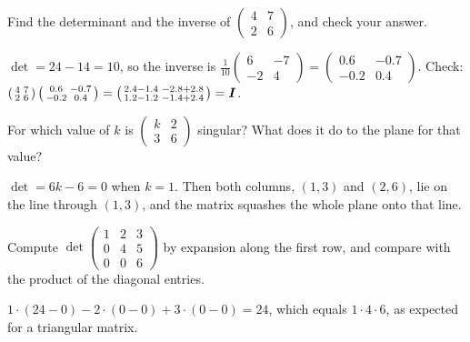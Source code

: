 \begin{exercise}
Find the determinant and the inverse of
$\left(\begin{smallmatrix} 4 & 7\\ 2 & 6\end{smallmatrix}\right)$, and check
your answer.
\end{exercise}
\begin{solution}
$\det = 24 - 14 = 10$, so the inverse is
$\tfrac{1}{10}\left(\begin{smallmatrix} 6 & -7\\ -2 & 4\end{smallmatrix}\right)
= \left(\begin{smallmatrix} 0.6 & -0.7\\ -0.2 & 0.4\end{smallmatrix}\right)$.
Check: $\left(\begin{smallmatrix} 4 & 7\\ 2 & 6\end{smallmatrix}\right)
\left(\begin{smallmatrix} 0.6 & -0.7\\ -0.2 & 0.4\end{smallmatrix}\right) =
\left(\begin{smallmatrix} 2.4 - 1.4 & -2.8 + 2.8\\ 1.2 - 1.2 & -1.4 +
2.4\end{smallmatrix}\right) = \bm{I}$.
\end{solution}

\begin{exercise}
For which value of $k$ is $\left(\begin{smallmatrix} k & 2\\ 3 &
6\end{smallmatrix}\right)$ singular? What does it do to the plane for that
value?
\end{exercise}
\begin{solution}
$\det = 6k - 6 = 0$ when $k = 1$. Then both columns, $(1, 3)$ and $(2, 6)$, lie
on the line through $(1, 3)$, and the matrix squashes the whole plane onto that
line.
\end{solution}

\begin{exercise}
Compute $\det\left(\begin{smallmatrix} 1 & 2 & 3\\ 0 & 4 & 5\\ 0 & 0 &
6\end{smallmatrix}\right)$ by expansion along the first row, and compare with
the product of the diagonal entries.
\end{exercise}
\begin{solution}
$1\cdot(24 - 0) - 2\cdot(0 - 0) + 3\cdot(0 - 0) = 24$, which equals
$1\cdot4\cdot6$, as expected for a triangular matrix.
\end{solution}

